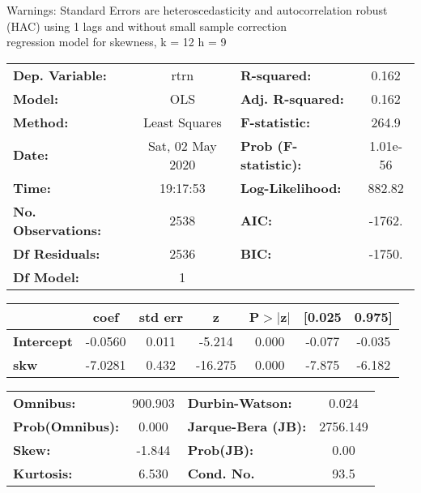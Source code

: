 Warnings: \newline
 [1] Standard Errors are heteroscedasticity and autocorrelation robust (HAC) using 1 lags and without small sample correction\\ 

regression model for skewness, k = 12 h = 9\begin{center}
\begin{tabular}{lclc}
\toprule
\textbf{Dep. Variable:}    &       rtrn       & \textbf{  R-squared:         } &     0.162   \\
\textbf{Model:}            &       OLS        & \textbf{  Adj. R-squared:    } &     0.162   \\
\textbf{Method:}           &  Least Squares   & \textbf{  F-statistic:       } &     264.9   \\
\textbf{Date:}             & Sat, 02 May 2020 & \textbf{  Prob (F-statistic):} &  1.01e-56   \\
\textbf{Time:}             &     19:17:53     & \textbf{  Log-Likelihood:    } &    882.82   \\
\textbf{No. Observations:} &        2538      & \textbf{  AIC:               } &    -1762.   \\
\textbf{Df Residuals:}     &        2536      & \textbf{  BIC:               } &    -1750.   \\
\textbf{Df Model:}         &           1      & \textbf{                     } &             \\
\bottomrule
\end{tabular}
\begin{tabular}{lcccccc}
                   & \textbf{coef} & \textbf{std err} & \textbf{z} & \textbf{P$> |$z$|$} & \textbf{[0.025} & \textbf{0.975]}  \\
\midrule
\textbf{Intercept} &      -0.0560  &        0.011     &    -5.214  &         0.000        &       -0.077    &       -0.035     \\
\textbf{skw}       &      -7.0281  &        0.432     &   -16.275  &         0.000        &       -7.875    &       -6.182     \\
\bottomrule
\end{tabular}
\begin{tabular}{lclc}
\textbf{Omnibus:}       & 900.903 & \textbf{  Durbin-Watson:     } &    0.024  \\
\textbf{Prob(Omnibus):} &   0.000 & \textbf{  Jarque-Bera (JB):  } & 2756.149  \\
\textbf{Skew:}          &  -1.844 & \textbf{  Prob(JB):          } &     0.00  \\
\textbf{Kurtosis:}      &   6.530 & \textbf{  Cond. No.          } &     93.5  \\
\bottomrule
\end{tabular}
\end{center}

